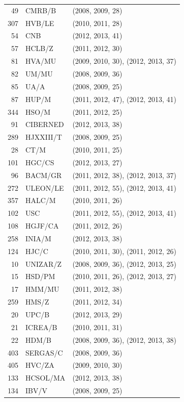 \documentclass[a4paper,twoside,10pt]{article}
\begin{document}
\begin{center}
\begin{longtable}{rlp{8.5cm}}
 49 & CMRB/B       &(2008, 2009, 28)\\
307 & HVB/LE       &(2010, 2011, 28)\\
 54 & CNB          &(2012, 2013, 41)\\
 57 & HCLB/Z       &(2011, 2012, 30)\\
 81 & HVA/MU       &(2009, 2010, 30), (2012, 2013, 37)\\
 82 & UM/MU        &(2008, 2009, 36)\\
 85 & UA/A         &(2008, 2009, 25)\\
 87 & HUP/M        &(2011, 2012, 47), (2012, 2013, 41)\\
344 & HSO/M        &(2011, 2012, 25)\\
 91 & CIBERNED     &(2012, 2013, 38)\\
289 & HJXXIII/T    &(2008, 2009, 25)\\
 28 & CT/M         &(2010, 2011, 25)\\
101 & HGC/CS       &(2012, 2013, 27)\\
 96 & BACM/GR      &(2011, 2012, 38), (2012, 2013, 37)\\
272 & ULEON/LE     &(2011, 2012, 55), (2012, 2013, 41)\\
357 & HALC/M       &(2010, 2011, 26)\\
102 & USC          &(2011, 2012, 55), (2012, 2013, 41)\\
108 & HGJF/CA      &(2011, 2012, 26)\\
258 & INIA/M       &(2012, 2013, 38)\\
124 & HJC/C        &(2010, 2011, 30), (2011, 2012, 26)\\
 10 & UNIZAR/Z     &(2008, 2009, 36), (2012, 2013, 25)\\
 15 & HSD/PM       &(2010, 2011, 26), (2012, 2013, 27)\\
 17 & HMM/MU       &(2011, 2012, 38)\\
259 & HMS/Z        &(2011, 2012, 34)\\
 20 & UPC/B        &(2012, 2013, 29)\\
 21 & ICREA/B      &(2010, 2011, 31)\\
 22 & HDM/B        &(2008, 2009, 36), (2012, 2013, 38)\\
403 & SERGAS/C     &(2008, 2009, 36)\\
405 & HVC/ZA       &(2009, 2010, 30)\\
133 & HCSOL/MA     &(2012, 2013, 38)\\
134 & IBV/V        &(2008, 2009, 25)\\

\end{longtable}
\end{center}
\end{document}
